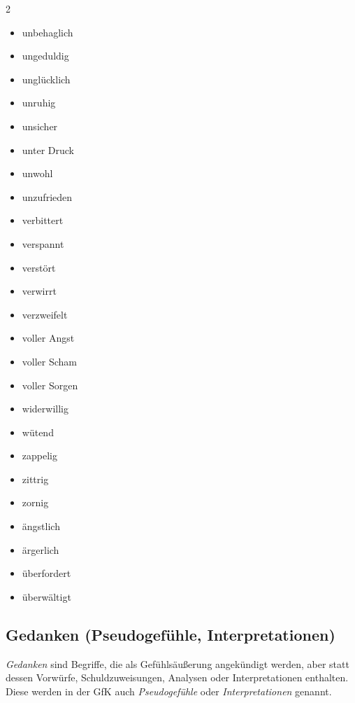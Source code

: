 \begin{multicols}{2}
\begin{itemize}
        \item unbehaglich
        \item ungeduldig
        \item unglücklich
        \item unruhig
        \item unsicher
        \item unter Druck
        \item unwohl
        \item unzufrieden
        \item verbittert
        \item verspannt
        \item verstört
        \item verwirrt
        \item verzweifelt
        \item voller Angst
        \item voller Scham
        \item voller Sorgen
        \item widerwillig
        \item wütend
        \item zappelig
        \item zittrig
        \item zornig
        \item ängstlich
        \item ärgerlich
        \item überfordert
        \item überwältigt
    \end{itemize}
\end{multicols}

\subsection{Gedanken (\glqq Pseudogefühle, Interpretationen\grqq)}
\label{pseudogefuehle}

\emph{Gedanken} sind Begriffe, die als Gefühlsäußerung angekündigt werden, aber statt dessen Vorwürfe, Schuldzuweisungen, Analysen oder Interpretationen enthalten. Diese werden in der GfK auch \emph{Pseudogefühle} oder \emph{Interpretationen} genannt.

